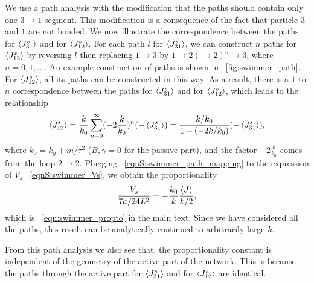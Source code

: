\documentclass[
 amsmath,amssymb,
 aps,
 pre,
 longbibliography,
 10pt, onecolumn,
 notitlepage
]{revtex4-1}
\begin{document}
We use a path analysis with the modification that the paths should contain only one $3\rightarrow 1$ segment. This modification is a consequence of the fact that particle $3$ and $1$ are not bonded.
We now illustrate the correspondence between the paths for $\expval{J_{31}^s}$ and for $\expval{J_{12}^s}$. For each path $l$ for $\expval{J_{31}^s}$, we can construct $n$ paths for $\expval{J_{12}^s}$ by reversing $l$ then replacing $1\rightarrow 3$ by $1\rightarrow 2(\rightarrow 2)^n \rightarrow 3$, where $n=0,1,\dots$. An example construction of paths is shown in \figurename~\ref{fig:swimmer_path}.
For $\expval{J_{12}^s}$, all its paths can be constructed in this way.
As a result, there is a $1$ to $n$ correspondence between the paths for $\expval{J_{31}^s}$ and for $\expval{J_{12}^s}$, which leads to the relationship
\begin{equation}
    \expval{J_{12}^s} = \frac{k}{k_0}\sum_{n=0}^\infty (-2\frac{k}{k_0})^n (-\expval{J_{31}^s}) = \frac{k/k_0}{1-(-2k/k_0)} (-\expval{J_{31}^s}), \label{eqnS:swimmer_path_mapping}
\end{equation}
where $k_0 = k_g + m/\tau^2$ ($B,\gamma=0$ for the passive part), and the factor $-2\frac{k}{k_0}$ comes from the loop $2\rightarrow 2$.
Plugging \eqnname~\eqref{eqnS:swimmer_path_mapping} to the expression of $V_s$ \eqnname~\eqref{eqnS:swimmer_Vs}, we obtain the proportionality
\begin{equation}
    \frac{V_s}{7a/24L^2} = -\frac{k_0}{k} \frac{\expval{J}}{k/2},
\end{equation}
which is \eqnname~\eqref{eqn:swimmer_propto} in the main text.
Since we have considered all the paths, this result can be analytically continued to arbitrarily large $k$.

From this path analysis we also see that, the proportionality constant is independent of the geometry of the active part of the network. This is because the paths through the active part for $\expval{J_{31}^s}$ and for $\expval{J_{12}^s}$ are identical.



\end{document}
